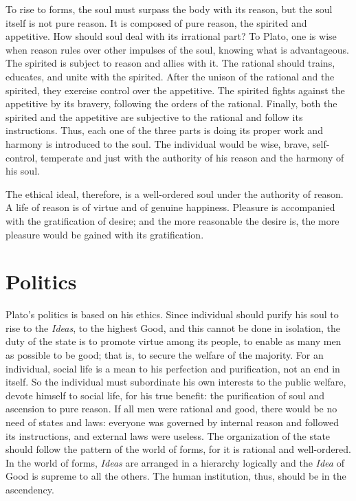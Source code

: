 \documentclass[11pt]{article}
\begin{document}
\newline

To rise to forms, the soul must surpass the body with its reason, but the soul itself is not pure reason. 
It is composed of pure reason, the spirited and appetitive. 
How should soul deal with its irrational part? 
To Plato, one is wise when reason rules over other impulses of the soul, knowing what is advantageous. 
The spirited is subject to reason and allies with it. 
The rational should trains, educates, and unite with the spirited. 
After the unison of the rational and the spirited, they exercise control over the appetitive. 
The spirited fights against the appetitive by its bravery, following the orders of the rational. 
Finally, both the spirited and the appetitive are subjective to the rational and follow its instructions. 
Thus, each one of the three parts is doing its proper work and harmony is introduced to the soul. 
The individual would be wise, brave, self-control, temperate and just with the authority of his reason and the harmony of his soul.

\newline

The ethical ideal, therefore, is a well-ordered soul under the authority of reason. 
A life of reason is of virtue and of genuine happiness. 
Pleasure is accompanied with the gratification of desire; 
and the more reasonable the desire is, the more pleasure would be gained with its gratification.
  
\section{Politics}
Plato’s politics is based on his ethics. 
Since individual should purify his soul to rise to the \textit{Ideas}, to the highest Good, and this cannot be done in isolation, the duty of the state is to promote virtue among its people, to enable as many men as possible to be good; 
that is, to secure the welfare of the majority. 
For an individual, social life is a mean to his perfection and purification, not an end in itself. 
So the individual must subordinate his own interests to the public welfare, devote himself to social life, for his true benefit: the purification of soul and ascension to pure reason. 
If all men were rational and good, there would be no need of states and laws: 
everyone was governed by internal reason and followed its instructions, and external laws were useless. 
The organization of the state should follow the pattern of the world of forms, for it is rational and well-ordered. 
In the world of forms, \textit{Ideas} are arranged in a hierarchy logically and the \textit{Idea} of Good is supreme to all the others. 
The human institution, thus, should be in the ascendency.
\end{document}
